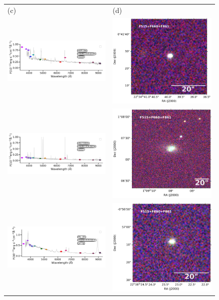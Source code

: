\documentclass[fleqn,usenatbib]{mnras}
\begin{document}
\begin{figure}
\begin{tabular}{ll}
    (c) & (d) \\
    \includegraphics[trim=10 0 5 10, clip]{Figs/spec-0376-52143-0631-STRIPE82-0142-027354.pdf} & \includegraphics[width=0.2\linewidth, trim=10 0 5 5, clip]{Figs/FASTT1560_338-0_80_F660-RGB.pdf} \\
     \includegraphics[trim=10 0 5 10, clip]{Figs/spec-0397-51794-0336-STRIPE82-0026-058736.pdf} & \includegraphics[width=0.2\linewidth, trim=10 0 5 5, clip]{Figs/LEDA1185205_17-1_200_F660-RGB.pdf} \\
     \includegraphics[trim=10 0 5 10, clip]{Figs/spec-9217-57934-0839-STRIPE82-0143-016137.pdf} & \includegraphics[width=0.2\linewidth, trim=10 0 5 5, clip]{Figs/PHL354_339-0_80_F660-RGB.pdf} \\

\end{tabular}
\end{figure}
\end{document}

